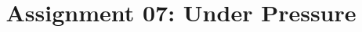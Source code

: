 \documentclass{article}
\title{Assignment 07: Under Pressure}
\begin{document}
\renderTitle
\end{document}
